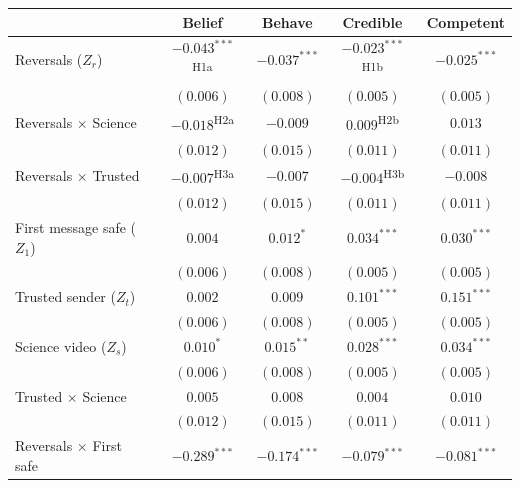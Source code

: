
\begin{table}
\begin{center}
\begin{tabular}{l c c || c c}
\hline
 & Belief & Behave & Credible & Competent \\
\hline
Reversals ($Z_r$)                      & $-0.043^{***}$\textsuperscript{\tiny H1a} & $-0.037^{***}$ & $-0.023^{***}$\textsuperscript{\tiny H1b} & $-0.025^{***}$ \\
                                       & $(0.006)$      & $(0.008)$      & $(0.005)$      & $(0.005)$      \\
Reversals $\times$ Science             & $-0.018$\textsuperscript{\tiny H2a} & $-0.009$       & $0.009$\textsuperscript{\tiny H2b} & $0.013$        \\
                                       & $(0.012)$      & $(0.015)$      & $(0.011)$      & $(0.011)$      \\
Reversals $\times$ Trusted             & $-0.007$\textsuperscript{\tiny H3a} & $-0.007$       & $-0.004$\textsuperscript{\tiny H3b} & $-0.008$       \\
                                       & $(0.012)$      & $(0.015)$      & $(0.011)$      & $(0.011)$      \\
\addlinespace[3pt]\hline
First message safe ($Z_1$)             & $0.004$        & $0.012^{*}$    & $0.034^{***}$  & $0.030^{***}$  \\
                                       & $(0.006)$      & $(0.008)$      & $(0.005)$      & $(0.005)$      \\
Trusted sender ($Z_t$)                 & $0.002$        & $0.009$        & $0.101^{***}$  & $0.151^{***}$  \\
                                       & $(0.006)$      & $(0.008)$      & $(0.005)$      & $(0.005)$      \\
Science video ($Z_s$)                  & $0.010^{*}$    & $0.015^{**}$   & $0.028^{***}$  & $0.034^{***}$  \\
                                       & $(0.006)$      & $(0.008)$      & $(0.005)$      & $(0.005)$      \\
\addlinespace[3pt]\hline
Trusted $\times$ Science               & $0.005$        & $0.008$        & $0.004$        & $0.010$        \\
                                       & $(0.012)$      & $(0.015)$      & $(0.011)$      & $(0.011)$      \\
Reversals $\times$ First safe          & $-0.289^{***}$ & $-0.174^{***}$ & $-0.079^{***}$ & $-0.081^{***}$ \\

\end{tabular}
\end{center}
\end{table}
